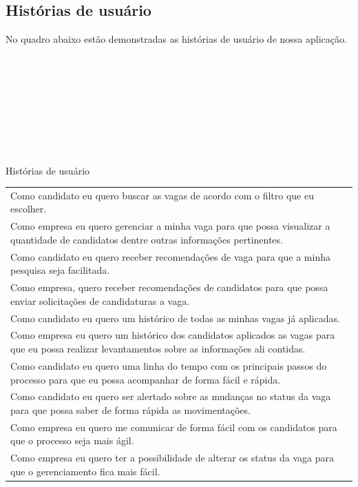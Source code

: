 \subsection{Histórias de usuário}

No quadro abaixo estão demonstradas as histórias de usuário de nossa aplicação.
\\
\\
\\
\\
\\
\\
\\
\\
\\
\begin{quadro}[thb]
	\centering
	\ABNTEXfontereduzida
	\caption{Histórias de usuário}
	\label{historias-usuario}
	\begin{tabular}{ | p{15.0cm} | }
	\hline
	\thead{História} \\
	\hline
	 Como candidato eu quero buscar as vagas de acordo com o filtro que eu escolher. \\
	 \hline
	 Como empresa eu quero gerenciar a minha vaga para que possa visualizar a quantidade de candidatos dentre outras informações pertinentes. \\
	 \hline
	 Como candidato eu quero receber recomendações de vaga para que a minha pesquisa seja facilitada. \\
	 \hline
	 Como empresa, quero receber recomendações de candidatos para que possa enviar solicitações de candidaturas a vaga. \\
	 \hline
	 Como candidato eu quero um histórico de todas as minhas vagas já aplicadas. \\
	 \hline
	 Como empresa eu quero um histórico dos candidatos aplicados as vagas para que eu possa realizar levantamentos sobre as informações ali contidas. \\
	 \hline
	 Como candidato eu quero uma linha do tempo com os principais passos do processo para que eu possa acompanhar de forma fácil e rápida. \\
	 \hline
	 Como candidato eu quero ser alertado sobre as mudanças no status da vaga para que possa saber de forma rápida as movimentações. \\
	 \hline
	 Como empresa eu quero me comunicar de forma fácil com os candidatos para que o processo seja mais ágil. \\
	 \hline
	 Como empresa eu quero ter a possibilidade de alterar os status da vaga para que o gerenciamento fica mais fácil. \\
	 \hline
	\end{tabular}
\end{quadro}


